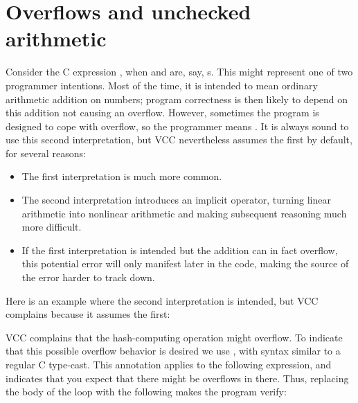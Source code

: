 
\section{Overflows and unchecked arithmetic}
\label{sect:overflows}

Consider the C expression , when  and  are,
say, s. This might represent one of two programmer
intentions. Most of the time, it is intended to mean ordinary
arithmetic addition on numbers; program correctness is then likely to
depend on this addition not causing an overflow. However, sometimes
the program is designed to cope with overflow, so the programmer means
. It is always sound to use this
second interpretation, but VCC nevertheless assumes the first by
default, for several reasons:
\begin{itemize}
\item The first interpretation is much more common.
\item The second interpretation introduces an implicit \vcc{\%}
  operator, turning linear arithmetic into nonlinear arithmetic and
  making subsequent reasoning much more difficult.
\item If the first interpretation is intended but the addition can in
  fact overflow, this potential error will only manifest later in the
  code, making the source of the error harder to track down.
\end{itemize}

Here is an example where the second interpretation is intended, but
VCC complains because it assumes the first:

\noindent
VCC complains that the hash-computing operation might overflow.
To indicate that this possible overflow behavior is desired we use ,
with syntax similar to a regular C type-cast.
This annotation applies to the following expression, and indicates that
you expect that there might be overflows in there.
Thus, replacing the body of the loop with the following
makes the program verify:


